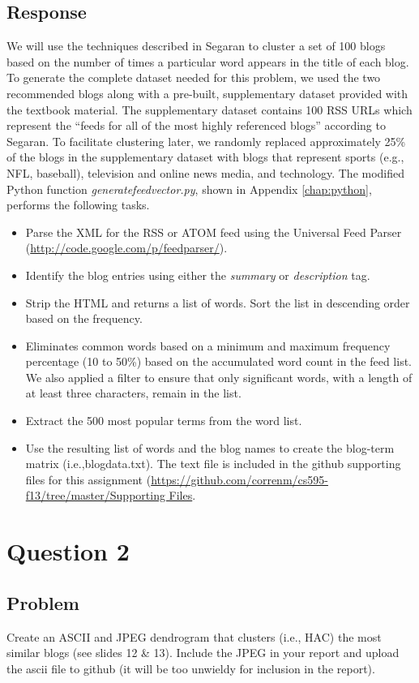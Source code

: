 \documentclass[letterpaper,11pt]{report}
\begin{document}
\begin{savenotes}
\subsection{Response}We will use the techniques described in Segaran \cite{segaran2007programming} to cluster a set of 100 blogs based on the number of times a particular word appears in the title of each blog. To generate the complete dataset needed for this problem, we used the two recommended blogs along with a pre-built, supplementary dataset provided with the textbook material. The supplementary dataset contains 100 RSS URLs which represent the ``feeds for all of the most highly referenced blogs'' according to Segaran. To facilitate clustering later, we randomly replaced approximately 25\% of the blogs in the supplementary dataset with blogs that represent sports (e.g., NFL, baseball), television and online news media, and technology. The modified Python function \emph{generatefeedvector.py}, shown in Appendix \ref{chap:python}, performs the following tasks.
\begin{itemize}
\item Parse the XML for the RSS or ATOM feed using the Universal Feed Parser (\url{http://code.google.com/p/feedparser/}).
\item Identify the blog entries using either the \emph{summary} or \emph{description} tag.
\item Strip the HTML and returns a list of words. Sort the list in descending order based on the frequency.
\item Eliminates common words based on a minimum and maximum frequency percentage (10 to 50\%) based on the accumulated word count in the feed list. We also applied a filter to ensure that only significant words, with a length of at least three characters, remain in the list.
\item Extract the 500 most popular terms from the word list.
\item Use the resulting list of words and the blog names to create the blog-term matrix (i.e.,blogdata.txt). The text file is included in the github supporting files for this assignment (\url{https://github.com/correnm/cs595-f13/tree/master/Supporting Files}.
\end{itemize}

\section{Question 2}
\subsection{Problem}Create an ASCII and JPEG dendrogram that clusters (i.e., HAC) the most similar blogs (see slides 12 \& 13).  Include the JPEG in your report and upload the ascii file to github (it will be too unwieldy for inclusion in the report).


\end{savenotes}
\end{document}
